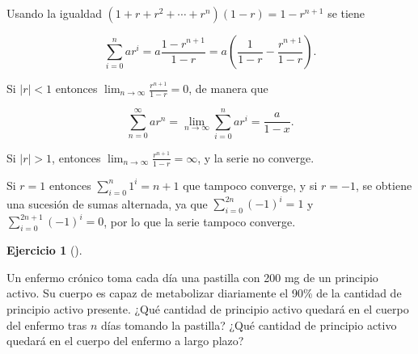 \documentclass[
  spanish,
  a4paper,
]{scrreport}
\theoremstyle{definition}
\newtheorem{exercise}{Ejercicio}[chapter]
\theoremstyle{remark}
\begin{document}
\begin{tcolorbox}[enhanced jigsaw, arc=.35mm, bottomrule=.15mm, bottomtitle=1mm, breakable, colback=white, colbacktitle=quarto-callout-tip-color!10!white, colframe=quarto-callout-tip-color-frame, coltitle=black, left=2mm, leftrule=.75mm, opacityback=0, opacitybacktitle=0.6, rightrule=.15mm, title=\textcolor{quarto-callout-tip-color}{\faLightbulb}\hspace{0.5em}{Solución}, titlerule=0mm, toprule=.15mm, toptitle=1mm]

Usando la igualdad \((1+r+r^2+\cdots + r^n)(1-r) = 1-r^{n+1}\) se tiene

\[
\sum_{i=0}^n ar^i = a\frac{1-r^{n+1}}{1-r} = a\left(\frac{1}{1-r}-\frac{r^{n+1}}{1-r}\right).
\]

Si \(|r|<1\) entonces \(\lim_{n\to\infty}\frac{r^{n+1}}{1-r} = 0\), de
manera que

\[
\sum_{n=0}^\infty ar^n = \lim_{n\to \infty}\sum_{i=0}^n ar^i = \frac{a}{1-x}.
\]

Si \(|r|>1\), entonces \(\lim_{n\to\infty}\frac{r^{n+1}}{1-r}=\infty\),
y la serie no converge.

Si \(r=1\) entonces \(\sum_{i=0}^n 1^i = n+1\) que tampoco converge, y
si \(r=-1\), se obtiene una sucesión de sumas alternada, ya que
\(\sum_{i=0}^{2n} (-1)^i = 1\) y \(\sum_{i=0}^{2n+1} (-1)^i = 0\), por
lo que la serie tampoco converge.

\end{tcolorbox}

\begin{exercise}[]\protect\hypertarget{exr-serie-geometrica-farmaco}{}\label{exr-serie-geometrica-farmaco}

Un enfermo crónico toma cada día una pastilla con 200 mg de un principio
activo. Su cuerpo es capaz de metabolizar diariamente el 90\% de la
cantidad de principio activo presente. ¿Qué cantidad de principio activo
quedará en el cuerpo del enfermo tras \(n\) días tomando la pastilla?
¿Qué cantidad de principio activo quedará en el cuerpo del enfermo a
largo plazo?

\end{exercise}
\end{document}
